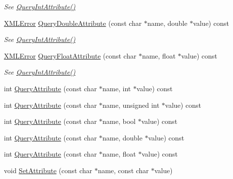 \begin{DoxyCompactItemize}
\begin{DoxyCompactList}\small\item\em See \hyperlink{classtinyxml2_1_1_x_m_l_element_a8b92c729346aa8ea9acd59ed3e9f2378}{Query\-Int\-Attribute()} \end{DoxyCompactList}\item 
\hyperlink{namespacetinyxml2_a1fbf88509c3ac88c09117b1947414e08}{X\-M\-L\-Error} \hyperlink{classtinyxml2_1_1_x_m_l_element_a1ffeed461d3e4020b39652cd6d3cd773}{Query\-Double\-Attribute} (const char $\ast$name, double $\ast$value) const 
\begin{DoxyCompactList}\small\item\em See \hyperlink{classtinyxml2_1_1_x_m_l_element_a8b92c729346aa8ea9acd59ed3e9f2378}{Query\-Int\-Attribute()} \end{DoxyCompactList}\item 
\hyperlink{namespacetinyxml2_a1fbf88509c3ac88c09117b1947414e08}{X\-M\-L\-Error} \hyperlink{classtinyxml2_1_1_x_m_l_element_a3f154e0b4b6903249ff9f758921758e5}{Query\-Float\-Attribute} (const char $\ast$name, float $\ast$value) const 
\begin{DoxyCompactList}\small\item\em See \hyperlink{classtinyxml2_1_1_x_m_l_element_a8b92c729346aa8ea9acd59ed3e9f2378}{Query\-Int\-Attribute()} \end{DoxyCompactList}\item 
int \hyperlink{classtinyxml2_1_1_x_m_l_element_aa471a199af9f137ef371f5db1ed1016b}{Query\-Attribute} (const char $\ast$name, int $\ast$value) const 
\item 
int \hyperlink{classtinyxml2_1_1_x_m_l_element_a60d18656aa70adb257eab18913aa4330}{Query\-Attribute} (const char $\ast$name, unsigned int $\ast$value) const 
\item 
int \hyperlink{classtinyxml2_1_1_x_m_l_element_a23fa8bac4250249c476c6bfdb6cb9b9c}{Query\-Attribute} (const char $\ast$name, bool $\ast$value) const 
\item 
int \hyperlink{classtinyxml2_1_1_x_m_l_element_a64aadcbf27423410e2896baf240f63f9}{Query\-Attribute} (const char $\ast$name, double $\ast$value) const 
\item 
int \hyperlink{classtinyxml2_1_1_x_m_l_element_afd553774be0e7760d73003058efa8df9}{Query\-Attribute} (const char $\ast$name, float $\ast$value) const 
\item 
void \hyperlink{classtinyxml2_1_1_x_m_l_element_a11943abf2d0831548c3790dd5d9f119c}{Set\-Attribute} (const char $\ast$name, const char $\ast$value)

\end{DoxyCompactItemize}
